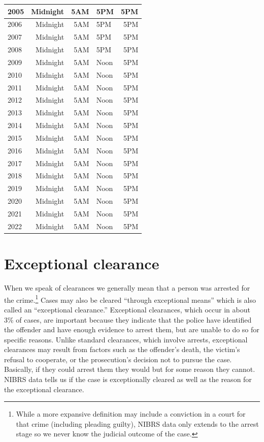 \documentclass[
]{krantz}
\begin{document}
\begin{longtable}[t]{l|r|r|l|r}
\hline
2005 & Midnight & 5AM & 5PM & 5PM\\
\hline
2006 & Midnight & 5AM & 5PM & 5PM\\
\hline
2007 & Midnight & 5AM & 5PM & 5PM\\
\hline
2008 & Midnight & 5AM & 5PM & 5PM\\
\hline
2009 & Midnight & 5AM & Noon & 5PM\\
\hline
2010 & Midnight & 5AM & Noon & 5PM\\
\hline
2011 & Midnight & 5AM & Noon & 5PM\\
\hline
2012 & Midnight & 5AM & Noon & 5PM\\
\hline
2013 & Midnight & 5AM & Noon & 5PM\\
\hline
2014 & Midnight & 5AM & Noon & 5PM\\
\hline
2015 & Midnight & 5AM & Noon & 5PM\\
\hline
2016 & Midnight & 5AM & Noon & 5PM\\
\hline
2017 & Midnight & 5AM & Noon & 5PM\\
\hline
2018 & Midnight & 5AM & Noon & 5PM\\
\hline
2019 & Midnight & 5AM & Noon & 5PM\\
\hline
2020 & Midnight & 5AM & Noon & 5PM\\
\hline
2021 & Midnight & 5AM & Noon & 5PM\\
\hline
2022 & Midnight & 5AM & Noon & 5PM\\
\hline
\end{longtable}

\section{Exceptional clearance}\label{exceptional-clearance}

When we speak of clearances we generally mean that a person
was arrested for the crime.\footnote{While a more expansive
  definition may include a conviction in a court for that
  crime (including pleading guilty), NIBRS data only extends
  to the arrest stage so we never know the judicial outcome
  of the case.} Cases may also be cleared ``through
exceptional means'' which is also called an ``exceptional
clearance.'' Exceptional clearances, which occur in about
3\% of cases, are important because they indicate that the
police have identified the offender and have enough evidence
to arrest them, but are unable to do so for specific
reasons. Unlike standard clearances, which involve arrests,
exceptional clearances may result from factors such as the
offender's death, the victim's refusal to cooperate, or the
prosecution's decision not to pursue the case. Basically, if
they could arrest them they would but for some reason they
cannot. NIBRS data tells us if the case is exceptionally
cleared as well as the reason for the exceptional clearance.
\end{document}
